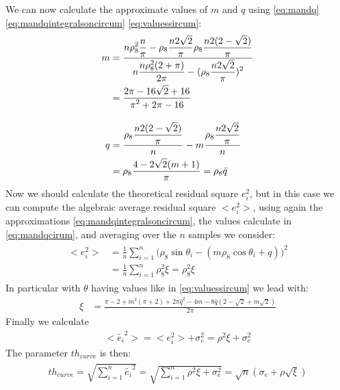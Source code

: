 \begin{itemize}
\begin{itemize}
We can now calculate the approximate values of $m$ and $q$ using \ref{eq:mandq} \ref{eq:mandqintegralsoncircum} \ref{eq:valuessircum}:
\begin{align}
\begin{split}
m &= \frac{\displaystyle n\rho_8^2\frac{n}{\pi} - \rho_8\frac{n2\sqrt{2}}{\pi} \rho_8\frac{n2(2-\sqrt{2})}{\pi} }{\displaystyle n\frac{n\rho_8^2(2+\pi)}{2\pi} -(\rho_8\frac{n2\sqrt{2}}{\pi})^2}\\
 &= \frac{\displaystyle 2\pi - 16\sqrt{2} + 16}{\displaystyle \pi^2 + 2\pi - 16}  \\[10pt]
q &= \frac{\displaystyle  \rho_8\frac{\displaystyle n2(2-\sqrt{2})}{\displaystyle \pi} }{\displaystyle n} - m\frac{\displaystyle  \rho_8\frac{n2\sqrt{2}}{\pi}}{\displaystyle n}\\
 &= \rho_8 \frac{\displaystyle 4-2\sqrt{2}(m+1)}{\displaystyle \pi} = \rho_8\bar{q} 
\end{split}
\label{eq:mandqcirum}
\end{align}
Now we should calculate the theoretical residual square $e_i^2$, but in this case we can compute the algebraic average residual square $<e_i^2>$, using again the approximations \ref{eq:mandqintegralsoncircum}, the values calculate in \ref{eq:mandqcirum}, and averaging over the $n$ samples we consider:
\begin{align}
\begin{split}
<e_i^2> &=  \frac{1}{n}\sum_{i = 1}^{n}{\Big(\rho_8\sin{\theta_i} - (m\rho_8\cos{\theta_i} + q)\Big)^2}\\
& =  \frac{1}{n}\sum_{i = 1}^{n} \rho_8^2 \xi = \rho_8^2 \xi 
\end{split}
\end{align}
In particular with $\theta$ having values like in \ref{eq:valuessircum} we lead with:
\begin{align}
\xi &= \frac{\pi - 2 + m^2(\pi+2) + 2\pi\bar{q}^2 - 4m -8\bar{q}(2-\sqrt{2}+ m\sqrt{2})}{2\pi}
\end{align}
Finally we calculate 
\begin{align*} 
<\tilde{e_i}^2>  = <e_i^2> + \sigma_e^2 = \rho^2 \xi  + \sigma_e^2 
\end{align*} 
The parameter $th_{curve}$ is then:
\begin{align}
\begin{split}
th_{curve} = \sqrt{\sum_{i=1}^{n}{\tilde{e_i}^2}} = \sqrt{\sum_{i=1}^{n}{\rho^2 \xi  + \sigma_e^2}} = \sqrt{n}(\sigma_e + \rho\sqrt{\xi})
\end{split}
\end{align}
\end{itemize}
\end{itemize}

